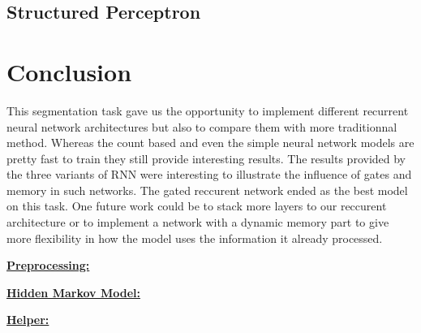 \documentclass[11pt]{article}
\begin{document}
\subsection{Structured Perceptron}


\section{Conclusion}

This segmentation task gave us the opportunity to implement different recurrent neural network architectures but also to compare them with more traditionnal method. Whereas the count based and even the simple neural network models are pretty fast to train they still provide interesting results. The results provided by the three variants of RNN were interesting to illustrate the influence of gates and memory in such networks. The gated reccurent network ended as the best model on this task. One future work could be to stack more layers to our reccurent architecture or to implement a network with a dynamic memory part to give more flexibility in how the model uses the information it already processed.



\begin{appendices}
\textbf{\huge\underline{Preprocessing:}}

\textbf{\huge\underline{Hidden Markov Model:}}

\textbf{\huge\underline{Helper:}}

\end{appendices}
\end{document}
